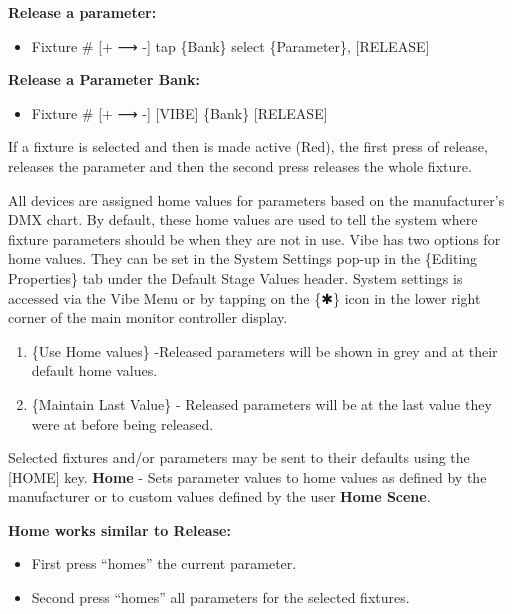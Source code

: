 \documentclass[
]{article}
\providecommand{\tightlist}{%
  \setlength{\itemsep}{0pt}\setlength{\parskip}{0pt}}
\begin{document}
\textbf{Release a parameter:}

\begin{itemize}
\tightlist
\item
  Fixture \# {[}+ ⟶ -{]} tap \{Bank\} select \{Parameter\}, {[}RELEASE{]}
\end{itemize}

\textbf{Release a Parameter Bank:}

\begin{itemize}
\tightlist
\item
  Fixture \# {[}+ ⟶ -{]} {[}VIBE{]} \{Bank\} {[}RELEASE{]}
\end{itemize}

If a fixture is selected and then is made active (Red), the first press of release, releases the parameter and then the second press releases the whole fixture.

All devices are assigned home values for parameters based on the manufacturer's DMX chart. By default, these home values are used to tell the system where fixture parameters should be when they are not in use. Vibe has two options for home values. They can be set in the System Settings pop-up in the \{Editing Properties\} tab under the Default Stage Values header. System settings is accessed via the Vibe Menu or by tapping on the \{✱\} icon in the lower right corner of the main monitor controller display.

\begin{enumerate}
\def\labelenumi{\arabic{enumi}.}
\item
  \{Use Home values\} -Released parameters will be shown in grey and at their default home values.
\item
  \{Maintain Last Value\} - Released parameters will be at the last value they were at before being released.
\end{enumerate}

Selected fixtures and/or parameters may be sent to their defaults using the {[}HOME{]} key.
\textbf{Home} - Sets parameter values to home values as defined by the manufacturer or to custom values defined by the user \textbf{Home Scene}.

\textbf{Home works similar to Release:}

\begin{itemize}
\item
  First press ``homes'' the current parameter.
\item
  Second press ``homes'' all parameters for the selected fixtures.
\end{itemize}
\end{document}
